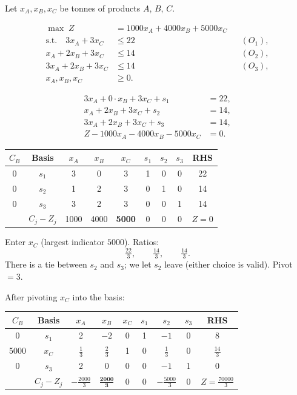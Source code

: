 Let \(x_A,x_B,x_C\) be tonnes of products \(A\), \(B\), \(C\).

\begin{align*}
  \max\; Z &= 1000x_A + 4000x_B + 5000x_C \\
  \text{s.t.}\quad
  3x_A + 3x_C &\le 22 && (O_1),\\
  x_A + 2x_B + 3x_C &\le 14 && (O_2),\\
  3x_A + 2x_B + 3x_C &\le 14 && (O_3),\\
  x_A,x_B,x_C &\ge 0.
\end{align*}

\begin{align*}
  3x_A + 0\cdot x_B + 3x_C + s_1 &= 22,\\
  x_A + 2x_B + 3x_C + s_2 &= 14,\\
  3x_A + 2x_B + 3x_C + s_3 &= 14,\\
  Z - 1000x_A - 4000x_B - 5000x_C &= 0.
\end{align*}

\begin{center}
\renewcommand{\arraystretch}{1.15}
\begin{tabular}{c|c|ccc|ccc|c}
\toprule
\(C_B\) & Basis & \(x_A\) & \(x_B\) & \(x_C\) & \(s_1\) & \(s_2\) & \(s_3\) & RHS \\
\midrule
0 & \(s_1\) & 3 & 0 & 3 & 1 & 0 & 0 & 22 \\
0 & \(s_2\) & 1 & 2 & 3 & 0 & 1 & 0 & 14 \\
0 & \(s_3\) & 3 & 2 & 3 & 0 & 0 & 1 & 14 \\
\midrule
 & \(C_j-Z_j\) & 1000 & 4000 & \textbf{5000} & 0 & 0 & 0 & \(Z=0\) \\
\bottomrule
\end{tabular}
\end{center}

Enter \(x_C\) (largest indicator \(5000\)). Ratios:
\[
  \tfrac{22}{3},\qquad \tfrac{14}{3},\qquad \tfrac{14}{3}.
\]
There is a tie between \(s_2\) and \(s_3\); we let \(s_2\) leave (either choice is valid).
Pivot \(=3\).

After pivoting \(x_C\) into the basis:
\begin{center}
\renewcommand{\arraystretch}{1.15}
\begin{tabular}{c|c|ccc|ccc|c}
\toprule
\(C_B\) & Basis & \(x_A\) & \(x_B\) & \(x_C\) & \(s_1\) & \(s_2\) & \(s_3\) & RHS \\
\midrule
0 & \(s_1\) & 2 & \(-2\) & 0 & 1 & \(-1\) & 0 & 8 \\
5000 & \(x_C\) & \(\tfrac13\) & \(\tfrac23\) & 1 & 0 & \(\tfrac13\) & 0 & \(\tfrac{14}{3}\) \\
0 & \(s_3\) & 2 & 0 & 0 & 0 & \(-1\) & 1 & 0 \\
\midrule
 & \(C_j-Z_j\) & \(-\tfrac{2000}{3}\) & \(\mathbf{\tfrac{2000}{3}}\) & 0 & 0 & \(-\tfrac{5000}{3}\) & 0 & \(Z=\tfrac{70000}{3}\) \\
\bottomrule
\end{tabular}
\end{center}

